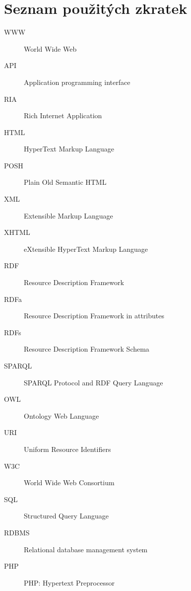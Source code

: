 \chapter{Seznam použitých zkratek}

\begin{description}
\item[WWW] World Wide Web
\item[API] Application programming interface
\item[RIA] Rich Internet Application
\item[HTML] HyperText Markup Language
\item[POSH] Plain Old Semantic HTML
\item[XML] Extensible Markup Language
\item[XHTML] eXtensible HyperText Markup Language
\item[RDF] Resource Description Framework
\item[RDFa] Resource Description Framework in attributes
\item[RDFs] Resource Description Framework Schema
\item[SPARQL] SPARQL Protocol and RDF Query Language
\item[OWL] Ontology Web Language
\item[URI] Uniform Resource Identifiers
\item[W3C] World Wide Web Consortium
\item[SQL] Structured Query Language
\item[RDBMS] Relational database management system
\item[PHP] PHP: Hypertext Preprocessor
\end{description}